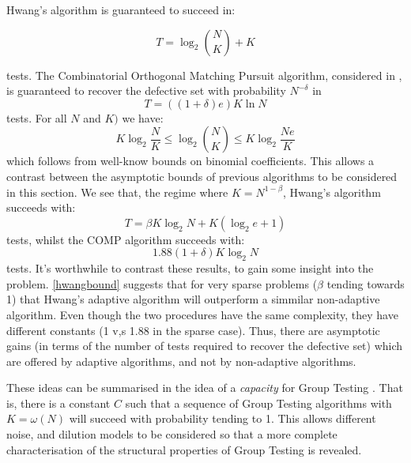 \documentclass[12pt, a4paper]{article}
\begin{document}
Hwang's algorithm is guaranteed to succeed in:

\begin{equation}
T = \log_2{N\choose K} + K
\end{equation}

tests. The Combinatorial Orthogonal Matching Pursuit algorithm, considered in \cite{Chan2011}, is guaranteed to recover the defective set with probability \(N^{-\delta} \) in
%
\begin{equation}
T = \left(\left(1+\delta\right)e\right)K\ln{N}
\end{equation}
%
tests. For all \(N\) and \(K)\) we have:
%
\begin{equation}
K\log_2{\frac{N}{K}} \leq \log_2{N \choose K} \leq K \log_2{\frac{Ne}{K}}
\end{equation}
%
which follows from well-know bounds on binomial coefficients. This allows a contrast between the asymptotic bounds of previous algorithms to be considered in this section. We see that, the regime where \(K = N^{1-\beta}\), Hwang's algorithm succeeds with:
%
\begin{equation}
T = \beta K \log_2{N} + K\left(\log_2{e} + 1\right)
\end{equation}
\label{hwangbound}
%
tests, whilst the COMP algorithm succeeds with:
%
\begin{equation}
1.88\left(1+\delta\right)K\log_2{N}
\end{equation}
\label{compbound}
%
tests. It's worthwhile to contrast these results, to gain some insight into the problem. \ref{hwangbound} suggests that for very sparse problems (\(\beta\) tending towards 1) that Hwang's adaptive algorithm will outperform a simmilar non-adaptive algorithm. Even though the two procedures have the same complexity, they have different constants (1 v,s 1.88 in the sparse case). Thus, there are asymptotic gains (in terms of the number of tests required to recover the defective set) which are offered by adaptive algorithms, and not by non-adaptive algorithms.

These ideas can be summarised in the idea of a \textit{capacity} for Group Testing \cite{Baldassini2013}. That is, there is a constant \(C\) such that a sequence of Group Testing algorithms with \( K = \omega\left(N\right)\) will succeed with probability tending to 1. This allows different noise, and dilution models to be considered so that a more complete characterisation of the structural properties of Group Testing is revealed.
 
\end{document}
